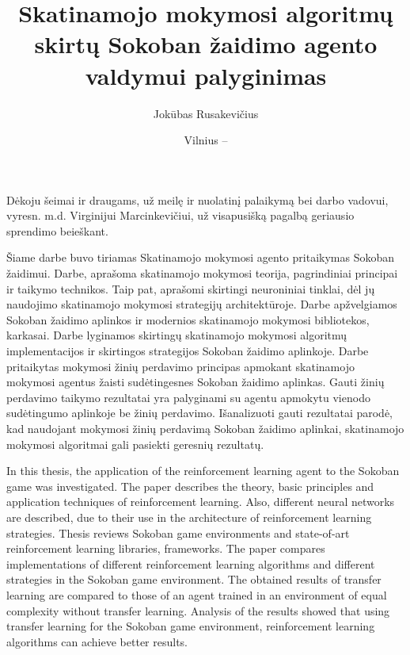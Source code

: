 \documentclass{VUMIFPSbakalaurinis}
\title{Skatinamojo mokymosi algoritmų skirtų Sokoban žaidimo agento valdymui palyginimas}
\author{Jokūbas Rusakevičius}
\date{Vilnius – \the\year}
\begin{document}
\maketitle
\setcounter{page}{2}

\sectionnonumnocontent{}
\vspace{7cm}
\begin{center}
Dėkoju šeimai ir draugams, už meilę ir nuolatinį palaikymą bei darbo vadovui, vyresn. m.d. Virginijui Marcinkevičiui, už visapusišką pagalbą geriausio sprendimo beieškant.
\end{center}


Šiame darbe buvo tiriamas Skatinamojo mokymosi agento pritaikymas Sokoban žaidimui. Darbe, aprašoma skatinamojo mokymosi teorija, pagrindiniai principai ir taikymo technikos. Taip pat, aprašomi skirtingi neuroniniai tinklai, dėl jų naudojimo skatinamojo mokymosi strategijų architektūroje. Darbe apžvelgiamos Sokoban žaidimo aplinkos ir modernios skatinamojo mokymosi bibliotekos, karkasai. Darbe lyginamos skirtingų skatinamojo mokymosi algoritmų implementacijos ir skirtingos strategijos Sokoban žaidimo aplinkoje. Darbe pritaikytas mokymosi žinių perdavimo principas apmokant skatinamojo mokymosi agentus žaisti sudėtingesnes Sokoban žaidimo aplinkas. Gauti žinių perdavimo taikymo rezultatai yra palyginami su agentu apmokytu vienodo sudėtingumo aplinkoje be žinių perdavimo. Išanalizuoti gauti rezultatai parodė, kad naudojant mokymosi žinių perdavimą Sokoban žaidimo aplinkai, skatinamojo mokymosi algoritmai gali pasiekti geresnių rezultatų.

In this thesis, the application of the reinforcement learning agent to the Sokoban game was investigated. The paper describes the theory, basic principles and application techniques of reinforcement learning. Also, different neural networks are described, due to their use in the architecture of reinforcement learning strategies. Thesis reviews Sokoban game environments and state-of-art reinforcement learning libraries, frameworks. The paper compares implementations of different reinforcement learning algorithms and different strategies in the Sokoban game environment. The obtained results of transfer learning are compared to those of an agent trained in an environment of equal complexity without transfer learning. Analysis of the results showed that using transfer learning for the Sokoban game environment, reinforcement learning algorithms can achieve better results.
\end{document}
